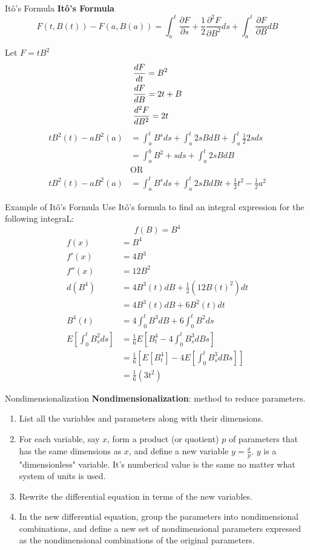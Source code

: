 \begin{frame}{It\^o's Formula}
\textbf{It\^{o}'s Formula} $$\displaystyle F(t, B(t))-F(a,B(a))=
 \int_{a}^{t} \frac{\partial F}{\partial s} + \frac{1}{2} \frac{\partial^2 F}{\partial B^2}ds+
 \int_a^t \frac{\partial F}{\partial B} dB$$

Let $F=tB^2$ 
\begin{align*}
\displaystyle
&\frac{dF}{dt}= B^2\\
&\frac{dF}{dB}=2t+B\\ 
&\frac{d^2 F}{dB^2}=2t
\end{align*}
\begin{align*}
tB^2(t)-aB^2(a) &=\int_{a}^{t}B^s ds+ \int_{a}^{t}2sBdB+\int_a^t \frac{1}{2}2sds\\
 &=\int_a^b B^2+sds+\int_a^t 2sBdB\\
 &\text{OR}\\
tB^2(t)-aB^2(a) &= \int_a^t B^s ds+ \int_a^t 2sBdBt+ \frac{1}{2} t^2- \frac{1}{2}a^2
\end{align*}
\end{frame}

\begin{frame}{Example of It\^o's Formula}
Use It\^o's formula to find an integral expression for the following integraL:
$$f(B)=B^4$$
\begin{align*}
f(x)&=B^4\\
f'(x)&=4B^3\\
f''(x)&=12B^2\\
d(B^4)&= 4B^3(t)dB+\frac{1}{2}(12B(t)^2)dt\\
	&=4B^3(t)dB+6B^2(t)dt\\
B^4(t)&= 4 \int_0^t B^3 dB+ 6 \int_0^t B^2 ds\\
E\left[\int_0^t B_s^2 ds\right] &= \frac{1}{6}E \left[B_t^4-4 \int_0^tB_s^3 dBs \right]\\
 &=\frac{1}{6}  \left[E \left[B_t^4\right]-4E\left[\int_0^t B_s^3 dBs \right] \right]\\
 &=\frac{1}{6}(3t^2)
\end{align*}
\end{frame}

\begin{frame}{Nondimensionalization}
\textbf{Nondimensionalization}: method to reduce parameters. 

\begin{enumerate}
\item
List all the variables and parameters along with their dimensions.
\item
For each variable, say $x$, form a product (or quotient) $p$ of parameters that has the same dimensions as $x$, and define a new variable $y=\frac{x}{p}.$ $y$ is a "dimensionless" variable. It's numberical  value is the same no matter what system of units is used.
\item Rewrite the differential equation in terms of the new variables.
\item 
In the new differential equation, group the parameters into nondimensional combinations, and define a new set of nondimensional parameters expressed as the nondimensional combinations of the original parameters. 
\end{enumerate}
\end{frame}

